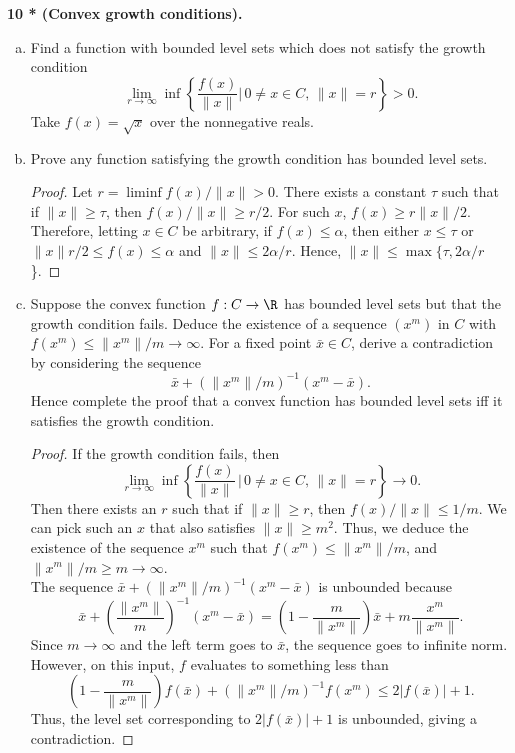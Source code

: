 \documentclass[12pt, letterpaper]{article}
\numberwithin{equation}{subsection}
\begin{document}
\textbf{10 * (Convex growth conditions).}
\begin{enumerate}[(a)]
\item Find a function with bounded level sets which does not satisfy 
the growth condition
\begin{equation*}
\lim_{r\to\infty}\inf\left\{\frac{f(x)}{\|x\|}\bigg|\, 0\neq x\in C,
\,\|x\| = r
\right\} > 0.
\end{equation*}
Take $f(x) = \sqrt{x}$ over the nonnegative reals.
\item Prove any function satisfying the growth condition has bounded 
level sets.
\begin{proof}
Let $r=\liminf f(x)/\|x\|>0$. There exists a constant $\tau$ such that 
if $\|x\|\geq\tau$, then $f(x)/\|x\|\geq r/2$. 
For such $x$, $f(x)\geq r\|x\|/2$. 
Therefore, letting $x\in C$ be arbitrary,
if $f(x)\leq \alpha$, then either $x\leq \tau$ or 
$\|x\|r/2\leq f(x)\leq \alpha$ and $\|x\|\leq 2\alpha/r$. Hence,
$\|x\|\leq \max\{\tau, 2\alpha/r$\}.
\end{proof}
\item Suppose the convex function $f:C\to\R$ has bounded level sets 
but that the growth condition fails. Deduce the existence of a sequence 
$(x^m)$ in $C$ with $f(x^m)\leq \|x^m\|/m \to\infty$. For a fixed 
point $\bar x\in C$, derive a contradiction by considering the 
sequence 
\begin{equation*}
\bar x+(\|x^m\|/m)^{-1}(x^m-\bar x).
\end{equation*}
Hence complete the proof that a convex function 
has bounded level sets iff it satisfies the growth condition.
\begin{proof}
If the growth condition fails, then 
\begin{equation*}
\lim_{r\to\infty} \inf\left\{\frac{f(x)}{\|x\|}\,\bigg|\, 0\neq x \in C,
\, \|x\|=r\right\} \to 0.
\end{equation*}
Then there exists an $r$ such that if $\|x\|\geq r$, then 
$f(x)/\|x\|\leq 1/m$. We can pick such an $x$ that also satisfies 
$\|x\|\geq m^2$. Thus, we deduce the 
existence of the sequence $x^m$ such that $f(x^m) \leq \|x^m\|/m$, and
$\|x^m\|/m \geq m \to\infty$.\\
The sequence $\bar x+(\|x^m\|/m)^{-1}(x^m-\bar x)$ is unbounded because 
\begin{equation*}
\bar x + \left(\frac{\|x^m\|}{m}\right)^{-1}(x^m-\bar x)
= \left(1-\frac{m}{\|x^m\|}\right)\bar x + m \frac{x^m}{\|x^m\|}.
\end{equation*}
Since $m\to\infty$ and the left term goes to $\bar x$, the sequence 
goes to infinite norm. However, on this input, $f$ evaluates to 
something less than 
\begin{equation*}
\left(1-\frac{m}{\|x^m\|}\right)f(\bar x) + (\|x^m\|/m)^{-1}f(x^m)
\leq 2|f(\bar x)| + 1.
\end{equation*}
Thus, the level set corresponding to $2|f(\bar x)|+1$ is unbounded,
giving a contradiction.
\end{proof}
\end{enumerate}
\end{document}
